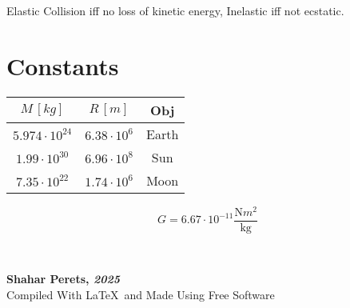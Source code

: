 \documentclass[]{article}
\newcommand\ndoc  {\dotfill \\ \vfil {\begin{center}
            {\textbf{Shahar Perets, \textit{2025}} \\
                \scriptsize {Compiled With \LaTeX \, and Made Using Free Software}}
    \end{center}} \vfil	}
\begin{document}
\begin{multicols}{3}
        Elastic Collision iff no loss of kinetic energy, Inelastic iff not ecstatic.  
        
        \section{Constants}
        \begin{center}
            \begin{tabular}{|c|c|c|}
                \hline $M \,[kg]$ & $R \,[m]$ & Obj \\
                \hline $5.974\cdot 10^{24}$ & $6.38\cdot 10^{6}$ &Earth \\
                \hline $1.99 \cdot 10^{30}$ & $6.96 \cdot 10^{8}$ & Sun \\
                \hline $7.35 \cdot 10^{22}$ & $1.74 \cdot 10^{6}$ & Moon \\
                \hline
            \end{tabular}
        \end{center}
        \[ G = 6.67 \cdot 10^{-11} \frac{\mathrm{N}m^2}{\mathrm{kg}} \]
	\end{multicols}
	\ndoc
	
\end{document}
